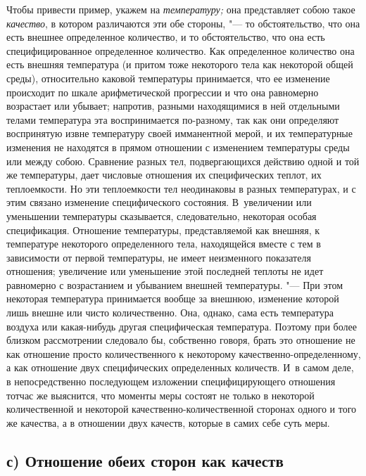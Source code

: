 Чтобы привести пример, укажем на {\em температуру;} она представляет собою
такое {\em качество}, в котором различаются эти обе стороны, "--- то
обстоятельство, что она есть внешнее определенное количество, и то
обстоятельство, что она есть специфицированное определенное количество. Как
определенное количество она есть внешняя температура (и притом тоже некоторого
тела как некоторой общей среды), относительно каковой температуры принимается,
что ее изменение происходит по шкале арифметической прогрессии и что она
равномерно возрастает или убывает; напротив, разными находящимися в ней
отдельными телами температура эта воспринимается по-разному, так как они
определяют воспринятую извне температуру своей имманентной мерой, и их
температурные изменения не находятся в прямом отношении с изменением
температуры среды или между собою. Сравнение разных тел, подвергающихся
действию одной и той же температуры, дает числовые отношения их специфических
теплот, их теплоемкости. Но эти теплоемкости тел неодинаковы в разных
температурах, и с этим связано изменение специфического состояния. В~увеличении
или уменьшении температуры сказывается, следовательно, некоторая особая
спецификация. Отношение температуры, представляемой как внешняя, к температуре
некоторого определенного тела, находящейся вместе с тем в зависимости от первой
температуры, не имеет неизменного показателя отношения; увеличение или
уменьшение этой последней теплоты не идет равномерно с возрастанием и убыванием
внешней температуры. "--- При этом некоторая температура принимается вообще за
внешнюю, изменение которой лишь внешне или чисто количественно. Она, однако,
сама есть температура воздуха или какая-нибудь другая специфическая
температура. Поэтому при более близком рассмотрении следовало бы, собственно
говоря, брать это отношение не как отношение просто количественного к
некоторому качественно-определенному, а как отношение двух специфических
определенных количеств. И~в самом деле, в непосредственно последующем изложении
специфицирующего отношения тотчас же выяснится, что моменты меры состоят не
только в некоторой количественной и некоторой качественно-количественной
сторонах одного и того же качества, а в отношении двух качеств, которые в самих
себе суть меры.


\subsection[с) Отношение обеих сторон как качеств]%
{с) Отношение обеих сторон как качеств}

